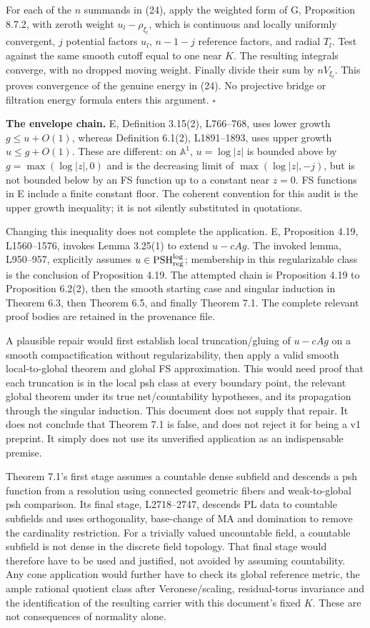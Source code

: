 \documentclass[
  11pt,
]{article}
\begin{document}
For each of the \(n\) summands in (24), apply the weighted form of G,
Proposition 8.7.2, with zeroth weight \(u_l-\rho_{\xi_l}\), which is
continuous and locally uniformly convergent, \(j\) potential factors
\(u_l\), \(n-1-j\) reference factors, and radial \(T_l\). Test against
the same smooth cutoff equal to one near \(K\). The resulting integrals
converge, with no dropped moving weight. Finally divide their sum by
\(nV_{\xi_l}\). This proves convergence of the genuine energy in (24).
No projective bridge or filtration energy formula enters this argument.
\(\square\)

\textbf{The envelope chain.} E, Definition 3.15(2), L766--768, uses
lower growth \(g\leq u+O(1)\), whereas Definition 6.1(2), L1891--1893,
uses upper growth \(u\leq g+O(1)\). These are different: on
\(\mathbb A^1\), \(u=\log|z|\) is bounded above by \(g=\max(\log|z|,0)\)
and is the decreasing limit of \(\max(\log|z|,-j)\), but is not bounded
below by an FS function up to a constant near \(z=0\). FS functions in E
include a finite constant floor. The coherent convention for this audit
is the upper growth inequality; it is not silently substituted in
quotations.

Changing this inequality does not complete the application. E,
Proposition 4.19, L1560--1576, invokes Lemma 3.25(1) to extend
\(u-cAg\). The invoked lemma, L950--957, explicitly assumes
\(u\in\operatorname{PSH}^{\log}_{\rm reg}\); membership in this
regularizable class is the conclusion of Proposition 4.19. The attempted
chain is Proposition 4.19 to Proposition 6.2(2), then the smooth
starting case and singular induction in Theorem 6.3, then Theorem 6.5,
and finally Theorem 7.1. The complete relevant proof bodies are retained
in the provenance file.

A plausible repair would first establish local truncation/gluing of
\(u-cAg\) on a smooth compactification without regularizability, then
apply a valid smooth local-to-global theorem and global FS
approximation. This would need proof that each truncation is in the
local psh class at every boundary point, the relevant global theorem
under its true net/countability hypotheses, and its propagation through
the singular induction. This document does not supply that repair. It
does not conclude that Theorem 7.1 is false, and does not reject it for
being a v1 preprint. It simply does not use its unverified application
as an indispensable premise.

Theorem 7.1's first stage assumes a countable dense subfield and
descends a psh function from a resolution using connected geometric
fibers and weak-to-global psh comparison. Its final stage, L2718--2747,
descends PL data to countable subfields and uses orthogonality,
base-change of MA and domination to remove the cardinality restriction.
For a trivially valued uncountable field, a countable subfield is not
dense in the discrete field topology. That final stage would therefore
have to be used and justified, not avoided by assuming countability. Any
cone application would further have to check its global reference
metric, the ample rational quotient class after Veronese/scaling,
residual-torus invariance and the identification of the resulting
carrier with this document's fixed \(K\). These are not consequences of
normality alone.
\end{document}
